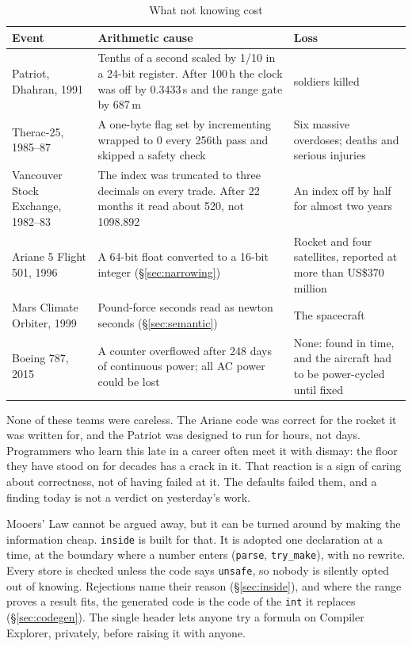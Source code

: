 \documentclass[11pt,a4paper]{article}
\newcommand{\code}[1]{\texttt{\small #1}}
\begin{document}
\begin{table}[ht]
\centering
\small
\caption{What not knowing cost}\label{tab:losses}
\renewcommand{\arraystretch}{1.15}
\begin{tabular}{@{}>{\raggedright\arraybackslash}p{3.0cm} >{\raggedright\arraybackslash}p{7.6cm} >{\raggedright\arraybackslash}p{4.4cm}@{}}
\toprule
Event & Arithmetic cause & Loss \\
\midrule
Patriot, Dhahran, 1991 & Tenths of a second scaled by 1/10 in a 24-bit register. After 100\,h the clock was off by 0.3433\,s and the range gate by 687\,m & 28 soldiers killed \\
Therac-25, 1985--87 & A one-byte flag set by incrementing wrapped to 0 every 256th pass and skipped a safety check & Six massive overdoses; deaths and serious injuries \\
Vancouver Stock Exchange, 1982--83 & The index was truncated to three decimals on every trade. After 22 months it read about 520, not 1098.892 & An index off by half for almost two years \\
Ariane 5 Flight 501, 1996 & A 64-bit float converted to a 16-bit integer (\S\ref{sec:narrowing}) & Rocket and four satellites, reported at more than US\$370 million \\
Mars Climate Orbiter, 1999 & Pound-force seconds read as newton seconds (\S\ref{sec:semantic}) & The spacecraft \\
Boeing 787, 2015 & A counter overflowed after 248 days of continuous power; all AC power could be lost & None: found in time, and the aircraft had to be power-cycled until fixed \\
\bottomrule
\end{tabular}
\end{table}

None of these teams were careless. The Ariane code was correct for the rocket
it was written for, and the Patriot was designed to run for hours, not days.
Programmers who learn this late in a career often meet it with dismay: the
floor they have stood on for decades has a crack in it. That reaction is a
sign of caring about correctness, not of having failed at it. The defaults
failed them, and a finding today is not a verdict on yesterday's work.

Mooers' Law cannot be argued away, but it can be turned around by making the
information cheap. \code{inside} is built for that. It is adopted one
declaration at a time, at the boundary where a number enters (\code{parse},
\code{try\_make}), with no rewrite. Every store is checked unless the code says
\code{unsafe}, so nobody is silently opted out of knowing. Rejections name
their reason (\S\ref{sec:inside}), and where the range proves a result fits,
the generated code is the code of the \code{int} it replaces
(\S\ref{sec:codegen}). The single header lets anyone try a formula on Compiler
Explorer, privately, before raising it with anyone.
\end{document}
